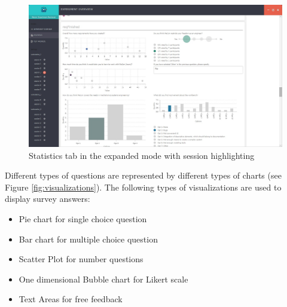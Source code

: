    \begin{figure}[htb]
 \centering
\includegraphics[width=\textwidth]{figures/statistics2.jpg}
\caption{Statistics tab in the expanded mode with session highlighting}
\label{fig:statistics2}
 \end{figure}

Different types of questions are represented by different types of charts (see Figure \ref{fig:visualizations}). The following types of visualizations are used to display survey answers:
\begin{itemize}
\item Pie chart for single choice question
\item Bar chart for multiple choice question
\item Scatter Plot for number questions
\item One dimensional Bubble chart for Likert scale 
\item Text Areas for free feedback
\end{itemize}


